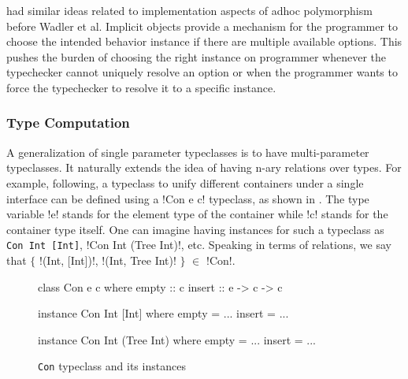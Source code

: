 \documentclass[manuscript,screen,nonacm]{acmart}
\begin{document}
\citet{kaes_parametric_1988} had similar ideas related to implementation aspects of adhoc polymorphism before Wadler et al. Implicit objects\cite{oliveira_typeclasses_2010} provide a mechanism for the programmer to choose the intended behavior instance if there are multiple available options. This pushes the burden of choosing the right instance on programmer whenever the typechecker cannot uniquely resolve an option or when the programmer wants to force the typechecker to resolve it to a specific instance. %

\subsubsection{Type Computation}
A generalization of single parameter typeclasses is to have multi-parameter typeclasses. It naturally extends the idea of having n-ary relations over types. For example, following\cite{jones_tcfd_2000}, a typeclass to unify different containers under a single interface can be defined using a !Con e c! typeclass, as shown in . The type variable !e! stands for the element type of the container while !c! stands for the container type itself. One can imagine having instances for such a typeclass as \lstinline{Con Int [Int]}, !Con Int (Tree Int)!, etc. Speaking in terms of relations, we say that $\{$ !(Int, [Int])!, !(Int, Tree Int)! $\}$ $\in$ !Con!.

\begin{figure}[ht]
\centering
\begin{minipage}[ht]{0.3\linewidth}
\begin{code}
class Con e c where
  empty :: c
  insert :: e -> c -> c
\end{code}
\end{minipage}%
\begin{minipage}[ht]{0.3\linewidth}
\begin{code}
instance Con Int [Int] where
  empty = ...
  insert = ...
\end{code}
\end{minipage}%
\begin{minipage}[ht]{0.3\linewidth}
\begin{code}
instance Con Int (Tree Int) where
  empty = ...
  insert = ...
\end{code}
\end{minipage}
\caption[\lstinline{Con} typeclass]{\lstinline{Con} typeclass and its instances}
\label{fig:tc-collection}
\end{figure}
\end{document}
